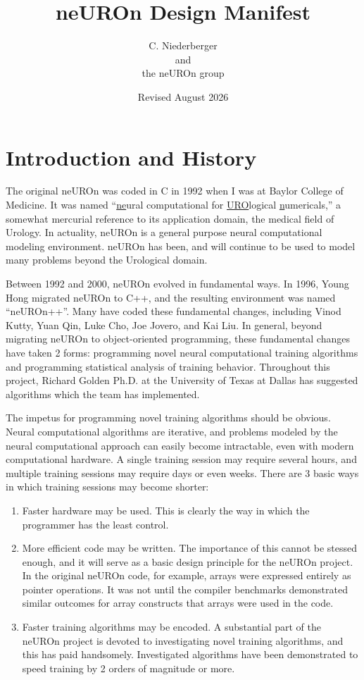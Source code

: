 \documentclass{report}
\title{neUROn Design Manifest}
\author{C. Niederberger\\and\\the neUROn group}
\date{Revised August 2026}
\begin{document}
\maketitle
\tableofcontents

\chapter{Introduction and History}

The original neUROn was coded in C in 1992 when
I was at Baylor College of Medicine.  It was named
``\underline{ne}ural computational for \underline{URO}logical
\underline{n}umericals,'' a somewhat mercurial reference to its
application domain, the medical field of Urology.  In actuality,
neUROn is a general purpose neural computational modeling environment.
neUROn has been, and will continue to be used to model many problems
beyond the Urological domain.

Between 1992 and 2000, neUROn evolved in fundamental ways.  In 1996,
Young Hong migrated neUROn to C++, and the resulting environment was
named ``neUROn++''.  Many have coded these
fundamental changes, including Vinod Kutty, Yuan Qin, Luke Cho, Joe
Jovero, and Kai Liu.  In general, beyond migrating neUROn to
object-oriented programming, these fundamental changes have taken 2
forms: programming novel neural computational training algorithms and
programming statistical analysis of training behavior.  Throughout
this project, Richard Golden Ph.D. at the
University of Texas at Dallas has suggested algorithms which the team
has implemented.

The impetus for programming novel training algorithms should be
obvious.  Neural computational algorithms are iterative, and problems
modeled by the neural computational approach can easily become
intractable, even with modern computational hardware.  A single
training session may require several hours, and multiple training
sessions may require days or even weeks.  There are 3 basic ways in
which training sessions may become shorter:

\begin{enumerate}
\item Faster hardware may be used.  This is clearly the way in which
      the programmer has the least control.
\item More efficient code may be written.  The importance of this
      cannot be stessed enough, and it will serve as a basic design
      principle for the neUROn project.  In the original neUROn code,
      for example, arrays were expressed entirely as pointer
      operations.  It was not until the compiler benchmarks
      demonstrated similar outcomes for array constructs that arrays
      were used in the code.
\item Faster training algorithms may be encoded.  A substantial part
      of the neUROn project is devoted to investigating novel training
      algorithms, and this has paid handsomely.  Investigated
      algorithms have been demonstrated to speed training by 2 orders
      of magnitude or more.
\end{enumerate}
\end{document}

